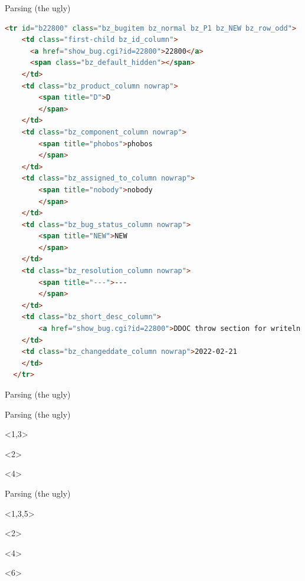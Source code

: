 \documentclass[aspectratio=169,notes]{beamer}
\begin{document}
	\begin{frame}[fragile]{Parsing (the ugly)}
		\begin{lstlisting}[language=html,basicstyle=\tiny\ttfamily]
  <tr id="b22800" class="bz_bugitem bz_normal bz_P1 bz_NEW bz_row_odd">
    <td class="first-child bz_id_column">
      <a href="show_bug.cgi?id=22800">22800</a>
      <span class="bz_default_hidden"></span>
    </td>
    <td class="bz_product_column nowrap">
        <span title="D">D
        </span>
    </td>
    <td class="bz_component_column nowrap">
        <span title="phobos">phobos
        </span>
    </td>
    <td class="bz_assigned_to_column nowrap">
        <span title="nobody">nobody
        </span>
    </td>
    <td class="bz_bug_status_column nowrap">
        <span title="NEW">NEW
        </span>
    </td>
    <td class="bz_resolution_column nowrap">
        <span title="---">---
        </span>
    </td>
    <td class="bz_short_desc_column">
        <a href="show_bug.cgi?id=22800">DDOC throw section for writeln is incomplete        </a>
    </td>
    <td class="bz_changeddate_column nowrap">2022-02-21
    </td>
  </tr>
		\end{lstlisting}
	\end{frame}
	\begin{frame}[fragile]{Parsing (the ugly)}
		
	\end{frame}
	\begin{frame}[fragile]{Parsing (the ugly)}
		\begin{onlyenv}
			
		\end{onlyenv}
		\begin{onlyenv}<2>
			
		\end{onlyenv}
		\begin{onlyenv}<4>
			
		\end{onlyenv}
	\end{frame}
	\begin{frame}[fragile]{Parsing (the ugly)}
		\begin{onlyenv}<1,3,5>
			
		\end{onlyenv}
		\begin{onlyenv}<2>
			
		\end{onlyenv}
		\begin{onlyenv}<4>
			
		\end{onlyenv}
		\begin{onlyenv}<6>
			
		\end{onlyenv}
	\end{frame}
\end{document}
